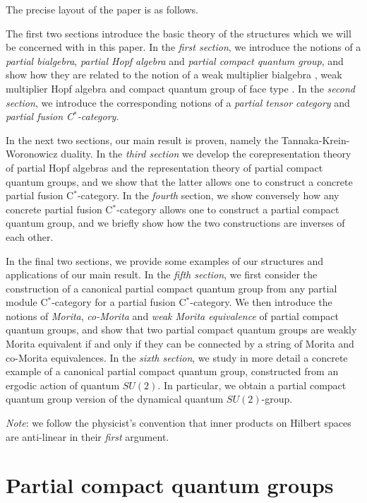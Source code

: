 \documentclass[10pt]{article}
\theoremstyle{definition}
\numberwithin{equation}{section}
\begin{document}
The precise layout of the paper is as follows.

The first two sections introduce the basic theory of the structures
which we will be concerned with in this paper. In the \emph{first
  section}, we introduce the notions of a \emph{partial bialgebra},
\emph{partial Hopf algebra} and \emph{partial compact quantum group},
and show how they are related to the notion of a weak multiplier
bialgebra \cite{Boh1}, weak multiplier Hopf algebra \cite{VDW1,VDW2}
and compact quantum group of face type \cite{Hay1}. In the
\emph{second section}, we introduce the corresponding notions of a \emph{partial tensor category} and \emph{partial fusion C$^*$-category}. 

In the next two sections, our main result is proven, namely the Tannaka-Krein-Woronowicz duality. In the \emph{third section} we develop the corepresentation theory of partial Hopf algebras and the representation theory of partial compact quantum groups, and we show that the latter allows one to construct a concrete partial fusion C$^*$-category. In the \emph{fourth} section, we show conversely how any concrete partial fusion C$^*$-category allows one to construct a partial compact quantum group, and we briefly show how the two constructions are inverses of each other.

In the final two sections, we provide some examples of our structures
and applications of our main result. In the \emph{fifth section}, we
first consider the construction of a canonical partial compact quantum
group from any partial module C$^*$-category for a partial fusion
C$^*$-category. We then introduce the notions of  \emph{Morita}, \emph{co-Morita} and \emph{weak Morita equivalence} \cite{Mug1} of partial compact quantum groups, and show that two partial compact quantum groups are weakly Morita equivalent if and only if they can be connected by a string of Morita and co-Morita equivalences. In the \emph{sixth section}, we study in more detail a concrete example of a canonical partial compact quantum group, constructed from an ergodic action of quantum $SU(2)$. In particular, we obtain a partial compact quantum group version of the dynamical quantum $SU(2)$-group. 

\emph{Note}: we follow the physicist's convention that inner products on Hilbert spaces are anti-linear in their \emph{first} argument. 


\section{Partial compact quantum groups}
\end{document}
